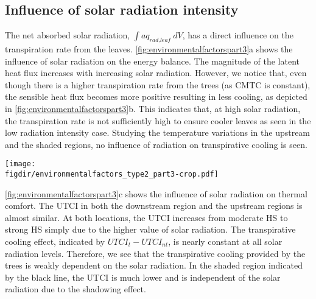 \subsection{Influence of solar radiation intensity}

The net absorbed solar radiation, $\int a q_{\textit{rad,leaf}}\ dV$, has a direct influence on the transpiration rate from the leaves. \cref{fig:environmentalfactorspart3}a shows the influence of solar radiation on the energy balance. The magnitude of the latent heat flux increases with increasing solar radiation. However, we notice that, even though there is a higher transpiration rate from the trees (as CMTC is constant), the sensible heat flux becomes more positive resulting in less cooling, as depicted in \cref{fig:environmentalfactorspart3}b. This indicates that, at high solar radiation, the transpiration rate is not sufficiently high to ensure cooler leaves as seen in the low radiation intensity case. Studying the temperature variations in the upstream and the shaded regions, no influence of radiation on transpirative cooling is seen. 
	
\begin{sidewaysfigure}[p]
	\centering
	\texttt{[image: \\figdir/environmentalfactors\_type2\_part3-crop.pdf]}
	\caption{Influence of solar radiation $q_{\textit{r,sw,0}}$ (W\,m$^{-2}$) on  on the net energy balance of radiation, sensible and latent heat fluxes at the trees, $\int a \cdot (q_{\textit{rad,leaf}}-q_{\textit{sen,leaf}}-q_{\textit{lat,leaf}})\ dA = 0$ (W\,m$^{-1}$),  on air temperature $T-T_0$ ($^{\circ}$C), and  on $\textit{UTCI}$ ($^{\circ}$C). The shaded region shows the difference $\textit{UTCI}_t-\textit{UTCI}_{\textit{nt}}$ ($^{\circ}$C). Point measurement of air temperature and $UTCI$ at three locations as shown in \cref{fig:domain}: \textit{upstream} ({\color{flatuidarkred}\textbf{red}}), \textit{downstream} ({\color{flatuidarkblue}\textbf{blue}}) and \textit{shaded} (\textbf{black}) for transpiring (T) (solid, ---) and non-transpiring (NT) conditions (dashed, - - -).}
	\label{fig:environmentalfactorspart3}
\end{sidewaysfigure}

\cref{fig:environmentalfactorspart3}c shows the influence of solar radiation on thermal comfort. The UTCI in both the downstream region and the upstream regions is almost similar. At both locations, the UTCI increases from moderate HS to strong HS simply due to the higher value of solar radiation. The transpirative cooling effect, indicated by $\textit{UTCI}_t-\textit{UTCI}_{\textit{nt}}$, is nearly constant at all solar radiation levels. Therefore, we see that the transpirative cooling provided by the trees is weakly dependent on the solar radiation. In the shaded region indicated by the black line, the UTCI is much lower and is independent of the solar radiation due to the shadowing effect. 

